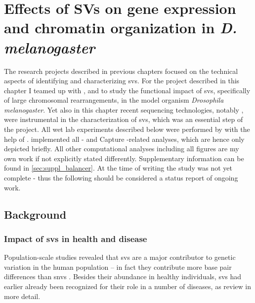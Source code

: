 \chapter{Effects of SVs on gene expression and chromatin
organization in \texorpdfstring{\textit{D. melanogaster}}{D. melanogaster}}
\label{sec:balancer}



The research projects described in previous chapters focused on the technical
aspects of identifying and characterizing \acp{sv}. For the project described in
this chapter I teamed up with \yad, \alek and \eileen to study the functional
impact of \acp{sv}, specifically of large chromosomal rearrangements, in the model
organism \textit{Drosophila melanogaster}. Yet also in this chapter recent
sequencing technologies, notably \hic, were instrumental in the characterization
of \acp{sv}, which was an essential step of the project. All wet lab experiments
described below were performed by \yad with the help of \rebecca.
\alek implemented all \hic- and Capture \hic-related analyses, which are hence
only depicted briefly. All other computational analyses including all figures
are my own work if not explicitly stated differently. Supplementary information
can be found in \cref{sec:suppl_balancer}. At the time of writing the study was
not yet complete - thus the following should be considered a status report of
ongoing work.



\section{Background}
\label{sec:balancer_background}


\subsection{Impact of \texorpdfstring{\acsp{sv}}{SVs} in health and disease}

Population-scale studies revealed that \acp{sv} are a major contributor to
genetic variation in the human population \citep{Conrad2010} – in fact they
contribute more base pair differences than \acp{snv} \citep{Sudmant2015}.
Besides their abundance in healthy individuals, \acp{sv} had earlier already
been recognized for their role in a number of diseases, as
\citet{Zhang2009,Weischenfeldt2013,Carvalho2016} review in more detail.

